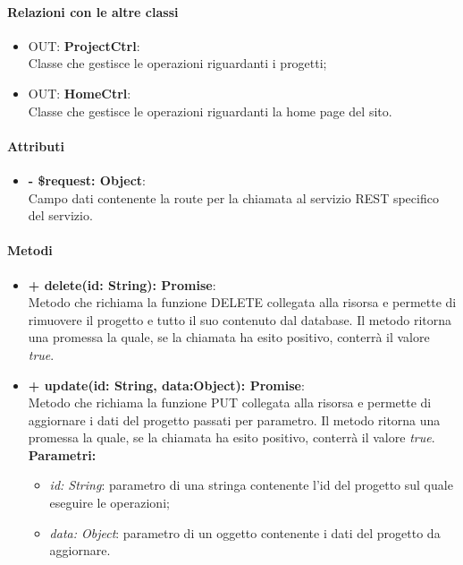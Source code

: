 		\paragraph{Relazioni con le altre classi}
		\begin{itemize}
			\item OUT: \textbf{ProjectCtrl}:\\
				Classe che gestisce le operazioni riguardanti i progetti;
			\item OUT: \textbf{HomeCtrl}:\\
				Classe che gestisce le operazioni riguardanti la home page del sito.
		\end{itemize}
		
		\paragraph{Attributi}
		\begin{itemize}
			\item \textbf{- \$request: Object}:\\
			Campo dati contenente la route per la chiamata al servizio REST specifico del servizio.
		\end{itemize}	
		
		\paragraph{Metodi}
		\begin{itemize}
			\item \textbf{+ delete(id: String): Promise}:\\
			Metodo che richiama la funzione DELETE collegata alla risorsa e permette di rimuovere il progetto e tutto il suo contenuto dal database. Il metodo ritorna una promessa la quale, se la chiamata ha esito positivo, conterrà il valore \textit{true}.\\
			\item \textbf{+ update(id: String, data:Object): Promise}:\\
			Metodo che richiama la funzione PUT collegata alla risorsa e permette di aggiornare i dati del progetto passati per parametro. Il metodo ritorna una promessa la quale, se la chiamata ha esito positivo, conterrà il valore \textit{true}.\\
			\textbf{Parametri:}\\
			\begin{itemize}
				\item \textit{id: String}: parametro di una stringa contenente l'id del progetto sul quale eseguire le operazioni;
				\item \textit{data: Object}: parametro di un oggetto contenente i dati del progetto da aggiornare.
			\end{itemize}
		\end{itemize}
\newpage


